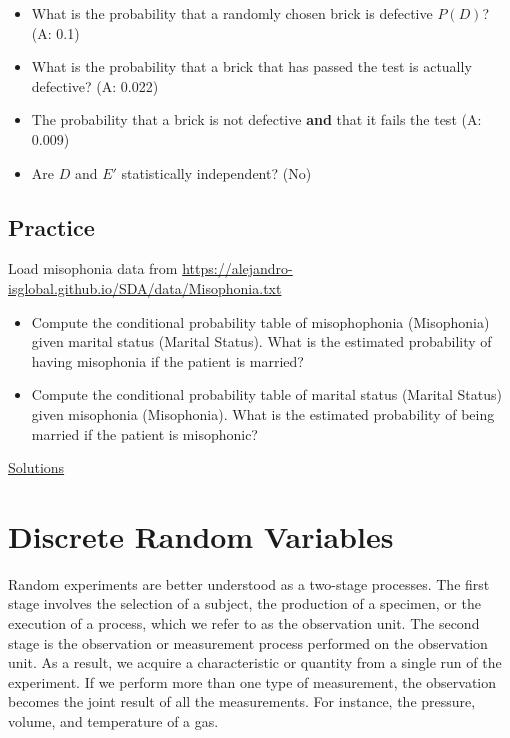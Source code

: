 \documentclass[
]{book}
\begin{document}
\begin{itemize}
\item
  What is the probability that a randomly chosen brick is defective \(P(D)\)? (A: 0.1)
\item
  What is the probability that a brick that has passed the test is actually defective? (A: 0.022)
\item
  The probability that a brick is not defective \textbf{and} that it fails the test (A: 0.009)
\item
  Are \(D\) and \(E'\) statistically independent? (No)
\end{itemize}

\hypertarget{practice-2}{%
\section{Practice}\label{practice-2}}

Load misophonia data from \url{https://alejandro-isglobal.github.io/SDA/data/Misophonia.txt}

\begin{itemize}
\item
  Compute the conditional probability table of misophophonia (Misophonia) given marital status (Marital Status). What is the estimated probability of having misophonia if the patient is married?
\item
  Compute the conditional probability table of marital status (Marital Status) given misophonia (Misophonia). What is the estimated probability of being married if the patient is misophonic?
\end{itemize}

\href{https://colab.research.google.com/drive/1ncTaoBgskCJcBIb0-PdnbUFr_AKU0XRF?usp=sharing}{Solutions}

\hypertarget{discrete-random-variables}{%
\chapter{Discrete Random Variables}\label{discrete-random-variables}}

Random experiments are better understood as a two-stage processes. The first stage involves the selection of a subject, the production of a specimen, or the execution of a process, which we refer to as the observation unit. The second stage is the observation or measurement process performed on the observation unit. As a result, we acquire a characteristic or quantity from a single run of the experiment. If we perform more than one type of measurement, the observation becomes the joint result of all the measurements. For instance, the pressure, volume, and temperature of a gas.
\end{document}
